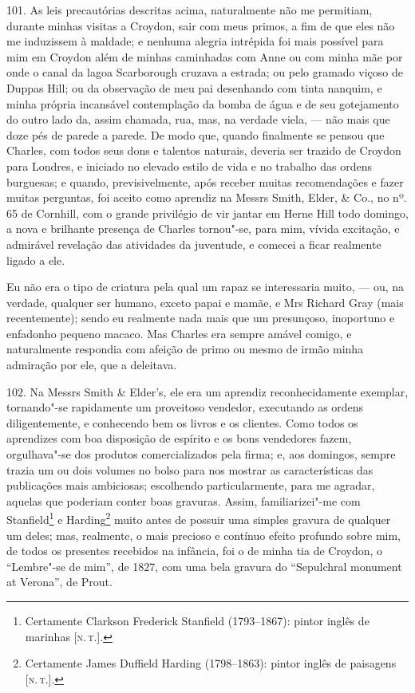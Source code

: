 101. As leis precautórias descritas acima, naturalmente não me
permitiam, durante minhas visitas a Croydon, sair com meus primos, a fim
de que eles não me induzissem à maldade; e nenhuma alegria intrépida foi
mais possível para mim em Croydon além de minhas caminhadas com Anne ou
com minha mãe por onde o canal da lagoa Scarborough cruzava a estrada;
ou pelo gramado viçoso de Duppas Hill; ou da observação de meu pai
desenhando com tinta nanquim, e minha própria incansável contemplação da
bomba de água e de seu gotejamento do outro lado da, assim chamada, rua,
mas, na verdade viela, --- não mais que doze pés de parede a parede. De
modo que, quando finalmente se pensou que Charles, com todos seus dons e
talentos naturais, deveria ser trazido de Croydon para Londres, e
iniciado no elevado estilo de vida e no trabalho das ordens burguesas; e
quando, previsivelmente, após receber muitas recomendações e fazer
muitas perguntas, foi aceito como aprendiz na Messrs Smith, Elder, \&
Co., no nº. 65 de Cornhill, com o grande privilégio de vir jantar em
Herne Hill todo domingo, a nova e brilhante presença de Charles
tornou"-se, para mim, vívida excitação, e admirável revelação das
atividades da juventude, e comecei a ficar realmente ligado a ele.

Eu não era o tipo de criatura pela qual um rapaz se interessaria muito,
--- ou, na verdade, qualquer ser humano, exceto papai e mamãe, e Mrs
Richard Gray (mais recentemente); sendo eu realmente nada mais que um
presunçoso, inoportuno e enfadonho pequeno macaco. Mas Charles era
sempre amável comigo, e naturalmente respondia com afeição de primo ou
mesmo de irmão minha admiração por ele, que a deleitava.

102. Na Messrs Smith \& Elder's, ele era um aprendiz reconhecidamente
exemplar, tornando"-se rapidamente um proveitoso vendedor, executando as
ordens diligentemente, e conhecendo bem os livros e os clientes. Como
todos os aprendizes com boa disposição de espírito e os bons vendedores
fazem, orgulhava"-se dos produtos comercializados pela firma; e, aos
domingos, sempre trazia um ou dois volumes no bolso para nos mostrar as
características das publicações mais ambiciosas; escolhendo
particularmente, para me agradar, aquelas que poderiam conter boas
gravuras. Assim, familiarizei"-me com Stanfield\footnote{Certamente
  Clarkson Frederick Stanfield (1793--1867): pintor inglês de marinhas
  {[}\textsc{n.\,t.}{]}.} e Harding\footnote{Certamente James Duffield Harding
  (1798--1863): pintor inglês de paisagens {[}\textsc{n.\,t.}{]}.} muito antes
de possuir uma simples gravura de qualquer um deles; mas, realmente, o
mais precioso e contínuo efeito profundo sobre mim, de todos os
presentes recebidos na infância, foi o de minha tia de Croydon, o
``Lembre"-se de mim'', de 1827, com uma bela gravura do ``Sepulchral
monument at Verona'', de Prout.

